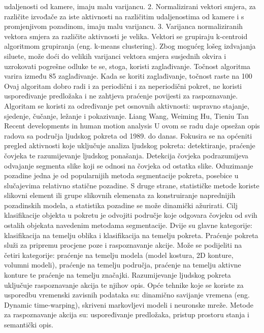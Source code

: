 \documentclass[times, utf8, diplomski]{fer}
\begin{document}
udaljenosti od kamere, imaju malu varijancu.
2. Normalizirani vektori smjera, za različite izvođače za iste aktivnosti na različitim
udaljenostima od kamere i s promjenjivom pozadinom, imaju malu varijancu.
3. Varijanca normaliziranih vektora smjera za različite aktivnosti je velika.
Vektori se grupiraju k-centroid algoritmom grupiranja (eng. k-means clustering).
Zbog mogućeg lošeg izdvajanja siluete, može doći do velikih varijanci vektora smjera
susjednih okvira i uzrokovati pogrešne odluke te se, stoga, koristi zaglađivanje.
Točnost algoritma varira između 85%
zaglađivanje. Kada se koriti zaglađivanje, točnost raste na 100%
Ovaj algoritam dobro radi i za periodični i za neperiodični pokret, ne koristi uspoređivanje
predložaka i ne zahtjeva praćenje povijesti za raspoznavanje. Algoritam se koristi za
određivanje pet osnovnih aktivnosti: uspravno stajanje, sjedenje, čučanje, ležanje i
pokazivanje.
Liang Wang, Weiming Hu, Tieniu Tan
Recent developments in human motion analysis
U ovom se radu daje opsežan opis radova sa područja ljudskog pokreta od 1989. do danas.
Fokusira se na općeniti pregled aktivnosti koje uključuje analiza ljudskog pokreta:
detektiranje, praćenje čovjeka te razumijevanje ljudskog ponašanja.
Detekcija čovjeka podrazumijeva odvajanje segmenta slike koji se odnosi na čovjeka od
ostatka slike. Oduzimanje pozadine jedna je od popularnijih metoda segmentacije pokreta,
posebice u slučajevima relativno statične pozadine. S druge strane, statističke metode koriste
slikovni element ili grupe slikovnih elemenata za konstruiranje naprednijih pozadinskih
modela, a statistika pozadine se može dinamički ažurirati.
Cilj klasifikacije objekta u pokretu je odvojiti područje koje odgovara čovjeku od svih ostalih
objekata navedenim metodama segmentacije. Dvije su glavne kategorije: klasifikacija na
temelju oblika i klasifikacija na temelju pokreta.
Praćenje pokreta služi za pripremu procjene poze i raspoznavanje akcije. Može se podijeliti na
četiri kategorije: praćenje na temelju modela (model kostura, 2D konture, volumni modeli),
praćenje na temelju područja, praćenje na temelju aktivne konture te praćenje na temelju
značajki.
Razumijevanje ljudskog pokreta uključuje raspoznavanje akcija te njihov opis. Opće tehnike
koje se koriste za usporedbu vremenski zavisnih podataka su: dinamično savijanje vremena
(eng. Dynamic time-warping), skriveni markovljevi modeli i neuronske mreže. Metode za
raspoznavanje akcija su: uspoređivanje predložaka, pristup prostoru stanja i semantički opis.
\end{document}
